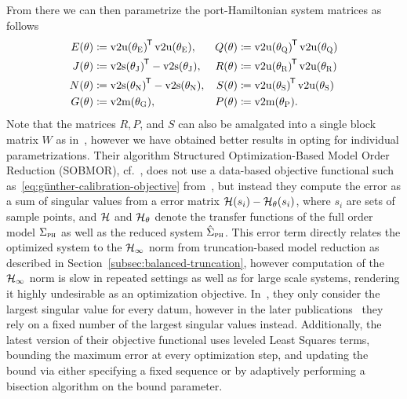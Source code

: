 From there we can then parametrize the port-Hamiltonian system matrices as follows
\begin{equation}\label{eq:sobmor-parametrization}
    \begin{alignedat}{3}
        E(\theta) &\coloneqq {\vecupper(\theta_\msc{E})}\trans \vecupper(\theta_\msc{E}),\quad &Q(\theta) &\coloneqq {\vecupper(\theta_\msc{Q})}\trans \vecupper(\theta_\msc{Q}) \\
        J(\theta) &\coloneqq {\vecstrict(\theta_\msc{J})}\trans - \vecstrict(\theta_\msc{J}),\quad &R(\theta) &\coloneqq {\vecupper(\theta_\msc{R})}\trans \vecupper(\theta_\msc{R}) \\
        N(\theta) &\coloneqq {\vecstrict(\theta_\msc{N})}\trans - \vecstrict(\theta_\msc{N}),\quad &S(\theta) &\coloneqq {\vecupper(\theta_\msc{S})}\trans \vecupper(\theta_\msc{S}) \\
        G(\theta) &\coloneqq \vecmat(\theta_\msc{G}),\quad &P(\theta) &\coloneqq \vecmat(\theta_\msc{P}).
    \end{alignedat}
\end{equation}
Note that the matrices $R, P$, and $S$ can also be amalgated into a single block matrix $W$ as in~\cite{Schwerdtner2021}, however we have obtained better results in opting for individual parametrizations.
Their algorithm Structured Optimization-Based Model Order Reduction (SOBMOR), cf.~\cite{Schwerdtner2023}, does not use a data-based objective functional such as~\eqref{eq:günther-calibration-objective} from~\cite{Günther2023}, but instead they compute the error as a sum of singular values from a error matrix $\mathcal{H}(s_i) - \mathcal{H}_\theta(s_i)$, where $s_i$ are sets of sample points, and $\mathcal{H}$ and $\mathcal{H}_\theta$ denote the transfer functions of the full order model $\Sigma_{\textnormal{\scshape ph}}$ as well as the reduced system $\hat{\Sigma}_{\textnormal{\scshape ph}}$.
This error term directly relates the optimized system to the $\mathcal{H}_\infty$ norm from truncation-based model reduction as described in Section~\ref{subsec:balanced-truncation}, however computation of the $\mathcal{H}_\infty$ norm is slow in repeated settings as well as for large scale systems, rendering it highly undesirable as an optimization objective.
In~\cite{Schwerdtner2021, SV2021}, they only consider the largest singular value for every datum, however in the later publications~\cite{Schwerdtner2022, Schwerdtner2023} they rely on a fixed number of the largest singular values instead.
Additionally, the latest version of their objective functional uses leveled Least Squares terms, bounding the maximum error at every optimization step, and updating the bound via either specifying a fixed sequence or by adaptively performing a bisection algorithm on the bound parameter.

